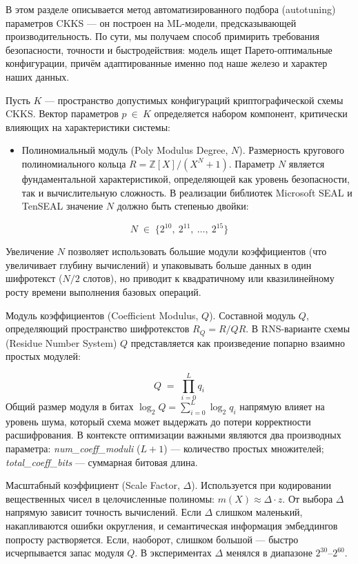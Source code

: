 \documentclass[a4paper, 12pt, oneside, openany]{article}
\begin{document}
В этом разделе описывается метод автоматизированного подбора (autotuning) параметров CKKS — он построен на ML-модели, предсказывающей производительность. По сути, мы получаем способ примирить требования безопасности, точности и быстродействия: модель ищет Парето-оптимальные конфигурации, причём адаптированные именно под наше железо и характер наших данных.

Пусть \(K\) --- пространство допустимых конфигураций криптографической схемы CKKS. Вектор параметров \(p\  \in \ K\) определяется набором компонент, критически влияющих на характеристики системы:
\begin{itemize}
	\item Полиномиальный модуль (Poly Modulus Degree, $N$). Размерность кругового полиномиального кольца $R = \mathbb{Z}[X] / (X^{N} + 1)$. Параметр $N$ является фундаментальной характеристикой, определяющей как уровень безопасности, так и вычислительную сложность. В реализации библиотек Microsoft SEAL и TenSEAL значение $N$ должно быть степенью двойки:
\end{itemize}

\begin{equation}
	N \;\in\; \bigl\{ 2^{10},\ 2^{11},\ \ldots,\ 2^{15} \bigr\}
	\label{eq:3-1}
\end{equation}

Увеличение $N$ позволяет использовать большие модули коэффициентов (что увеличивает глубину вычислений) и упаковывать больше данных в один шифротекст ($N/2$ слотов), но приводит к квадратичному или квазилинейному росту времени выполнения базовых операций.

Модуль коэффициентов (Coefficient Modulus, $Q$). Составной модуль $Q$, определяющий пространство шифротекстов $R_{Q} = R/QR$. В RNS-варианте схемы (Residue Number System) $Q$ представляется как произведение попарно взаимно простых модулей:

\begin{equation}
	Q \;=\; \prod_{i = 0}^{L} q_{i}
	\label{eq:3-2}
\end{equation}
Общий размер модуля в битах $\log_{2} Q = \sum_{i=0}^{L} \log_{2} q_{i}$ напрямую влияет на уровень шума, который схема может выдержать до потери корректности расшифрования. В контексте оптимизации важными являются два производных параметра: \emph{num\_coeff\_moduli} ($L + 1$) --- количество простых множителей; \emph{total\_coeff\_bits} --- суммарная битовая длина.

Масштабный коэффициент (Scale Factor, $\Delta$). Используется при кодировании вещественных чисел в целочисленные полиномы: $m(X) \approx \Delta \cdot z$. От выбора $\Delta$ напрямую зависит точность вычислений. Если $\Delta$ слишком маленький, накапливаются ошибки округления, и семантическая информация эмбеддингов попросту растворяется. Если, наоборот, слишком большой — быстро исчерпывается запас модуля $Q$. В экспериментах $\Delta$ менялся в диапазоне $2^{30}$–$2^{60}$.
\end{document}
